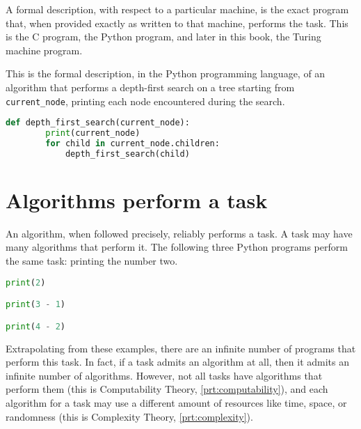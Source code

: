 \begin{example}
\end{example}

A formal description, with respect to a particular machine, is the exact program that, when provided exactly as written to that machine, performs the task.
This is the C program, the Python program, and later in this book, the Turing machine program.

\begin{example}
  This is the formal description, in the Python programming language, of an algorithm that performs a depth-first search on a tree starting from \verb|current_node|, printing each node encountered during the search.
  \begin{lstlisting}[language=Python]
    def depth_first_search(current_node):
        print(current_node)
        for child in current_node.children:
            depth_first_search(child)
  \end{lstlisting}
\end{example}

\section{Algorithms perform a task}

An algorithm, when followed precisely, reliably performs a task.
A task may have many algorithms that perform it.
The following three Python programs perform the same task: printing the number two.
\begin{lstlisting}[language=Python]
print(2)

print(3 - 1)

print(4 - 2)
\end{lstlisting}
Extrapolating from these examples, there are an infinite number of programs that perform this task.
In fact, if a task admits an algorithm at all, then it admits an infinite number of algorithms.
However, not all tasks have algorithms that perform them (this is Computability Theory, \autoref{prt:computability}), and each algorithm for a task may use a different amount of resources like time, space, or randomness (this is Complexity Theory, \autoref{prt:complexity}).
